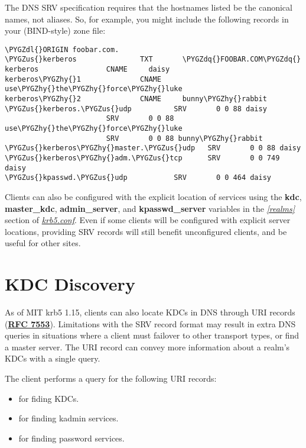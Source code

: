 \documentclass[letterpaper,10pt,english]{sphinxmanual}
\def\PYGZus{\char`\_}
\def\PYGZdl{\char`\$}
\def\PYGZhy{\char`\-}
\def\PYGZdq{\char`\"}
\begin{document}
The DNS SRV specification requires that the hostnames listed be the
canonical names, not aliases.  So, for example, you might include the
following records in your (BIND-style) zone file:

\begin{Verbatim}[commandchars=\\\{\}]
\PYGZdl{}ORIGIN foobar.com.
\PYGZus{}kerberos               TXT       \PYGZdq{}FOOBAR.COM\PYGZdq{}
kerberos                CNAME     daisy
kerberos\PYGZhy{}1              CNAME     use\PYGZhy{}the\PYGZhy{}force\PYGZhy{}luke
kerberos\PYGZhy{}2              CNAME     bunny\PYGZhy{}rabbit
\PYGZus{}kerberos.\PYGZus{}udp          SRV       0 0 88 daisy
                        SRV       0 0 88 use\PYGZhy{}the\PYGZhy{}force\PYGZhy{}luke
                        SRV       0 0 88 bunny\PYGZhy{}rabbit
\PYGZus{}kerberos\PYGZhy{}master.\PYGZus{}udp   SRV       0 0 88 daisy
\PYGZus{}kerberos\PYGZhy{}adm.\PYGZus{}tcp      SRV       0 0 749 daisy
\PYGZus{}kpasswd.\PYGZus{}udp           SRV       0 0 464 daisy
\end{Verbatim}

Clients can also be configured with the explicit location of services
using the \textbf{kdc}, \textbf{master\_kdc}, \textbf{admin\_server}, and
\textbf{kpasswd\_server} variables in the {\hyperref[admin/conf_files/krb5_conf:realms]{\emph{{[}realms{]}}}} section of
{\hyperref[admin/conf_files/krb5_conf:krb5-conf-5]{\emph{krb5.conf}}}.  Even if some clients will be configured with
explicit server locations, providing SRV records will still benefit
unconfigured clients, and be useful for other sites.


\section{KDC Discovery}
\label{admin/realm_config:kdc-discovery}\label{admin/realm_config:id1}
As of MIT krb5 1.15, clients can also locate KDCs in DNS through URI
records (\href{http://tools.ietf.org/html/rfc7553.html}{\textbf{RFC 7553}}).  Limitations with the SRV record format may
result in extra DNS queries in situations where a client must failover
to other transport types, or find a master server.  The URI record can
convey more information about a realm's KDCs with a single query.

The client performs a query for the following URI records:
\begin{itemize}
\item {} 
 for fiding KDCs.

\item {} 
 for finding kadmin services.

\item {} 
 for finding password services.

\end{itemize}
\end{document}
